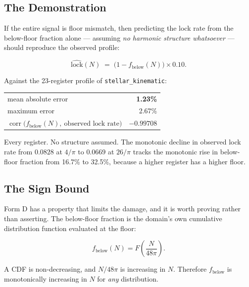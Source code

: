 \documentclass[11pt, letterpaper, openany]{book}
\begin{document}
\subsection{The Demonstration}

If the entire signal is floor mismatch, then predicting the lock rate from the below-floor
fraction alone --- assuming \emph{no harmonic structure whatsoever} --- should reproduce the
observed profile:

\begin{equation}
\widehat{\text{lock}}(N) \;=\; \bigl(1 - f_{\text{below}}(N)\bigr) \times 0.10 .
\label{eq:floormodel}
\end{equation}

\begin{signalbox}
Against the 23-register profile of \texttt{stellar\_kinematic}:

\medskip
\begin{tabular}{@{}lr@{}}
mean absolute error & \textbf{1.23\%} \\
maximum error & 2.67\% \\
$\operatorname{corr}\bigl(f_{\text{below}}(N),\ \text{observed lock rate}\bigr)$ & \textbf{$-0.99708$} \\
\end{tabular}

\medskip
\noindent Every register. No structure assumed. The monotonic decline in observed lock rate
from $0.0828$ at $4/\pi$ to $0.0669$ at $26/\pi$ tracks the monotonic rise in below-floor
fraction from 16.7\% to 32.5\%, because a higher register has a higher floor.
\end{signalbox}

\subsection{The Sign Bound}

Form D has a property that limits the damage, and it is worth proving rather than asserting.
The below-floor fraction is the domain's own cumulative distribution function evaluated at the
floor:

\begin{equation}
f_{\text{below}}(N) = F\!\left(\frac{N}{48\pi}\right).
\end{equation}

\noindent A CDF is non-decreasing, and $N/48\pi$ is increasing in $N$. Therefore
$f_{\text{below}}$ is monotonically increasing in $N$ for \emph{any} distribution.
\end{document}

